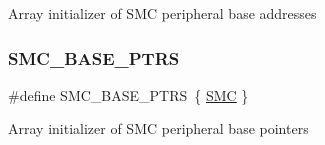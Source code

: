 Array initializer of S\+MC peripheral base addresses \mbox{\label{group___s_m_c___peripheral___access___layer_gae583f3f0917ee513adcac36dd042a5f3}} 
\subsubsection{\texorpdfstring{SMC\_BASE\_PTRS}{SMC\_BASE\_PTRS}}
{\footnotesize\ttfamily \#define S\+M\+C\+\_\+\+B\+A\+S\+E\+\_\+\+P\+T\+RS~\{ \mbox{\hyperlink{group___s_m_c___peripheral___access___layer_ga6667e81e5b32250febd3d46511d9309d}{S\+MC}} \}}

Array initializer of S\+MC peripheral base pointers 